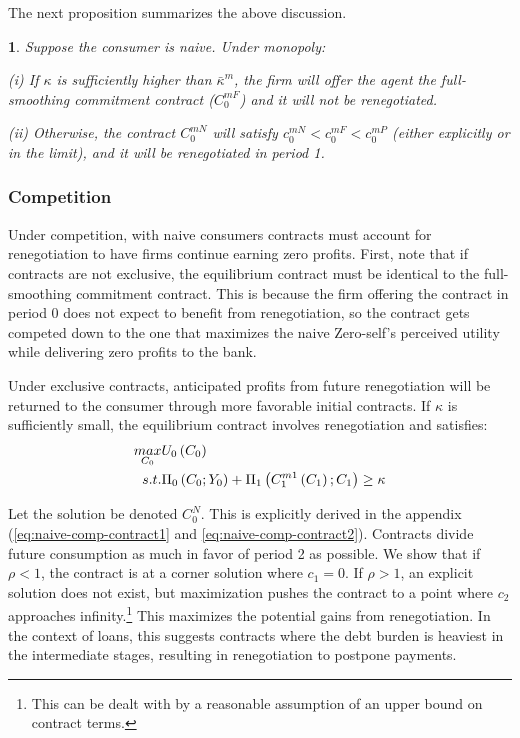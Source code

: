 \documentclass[11pt,english]{article}
\theoremstyle{plain}
\newtheorem{prop}{\protect\propositionname}
\theoremstyle{definition}
\providecommand{\propositionname}{Proposition}
\begin{document}
The next proposition summarizes the above discussion. 
\begin{prop}
Suppose the consumer is naive. Under monopoly:

(i) If $\kappa$ is sufficiently higher than $\bar{\kappa}^{m}$,
the firm will offer the agent the full-smoothing commitment contract
($C_{0}^{mF}$) and it will not be renegotiated. 

(ii) Otherwise, the contract $C_{0}^{mN}$ will satisfy $c_{0}^{mN}<c_{0}^{mF}<c_{0}^{mP}$
(either explicitly or in the limit), and it will be renegotiated in
period 1. 
\end{prop}

\subsubsection{Competition}

Under competition, with naive consumers contracts must account for
renegotiation to have firms continue earning zero profits. First,
note that if contracts are not exclusive, the equilibrium contract
must be identical to the full-smoothing commitment contract. This
is because the firm offering the contract in period 0 does not expect
to benefit from renegotiation, so the contract gets competed down
to the one that maximizes the naive Zero-self's perceived utility
while delivering zero profits to the bank.

Under exclusive contracts, anticipated profits from future renegotiation
will be returned to the consumer through more favorable initial contracts.
If $\kappa$ is sufficiently small, the equilibrium contract involves
renegotiation and satisfies: 
\begin{align}
\underset{C_{0}}{\mbox{\ensuremath{max}}} & U_{0}\left(C_{0}\right)\nonumber \\
s.t. & \Pi_{0}\left(C_{0};Y_{0}\right)+\Pi_{1}\left(C_{1}^{m1}\left(C_{1}\right);C_{1}\right)\geq\kappa
\end{align}

Let the solution be denoted $C_{0}^{N}$. This is explicitly derived
in the appendix (\ref{eq:naive-comp-contract1} and \ref{eq:naive-comp-contract2}).
Contracts divide future consumption as much in favor of period 2 as
possible. We show that if $\rho<1$, the contract is at a corner solution
where $c_{1}=0$. If $\rho>1$, an explicit solution does not exist,
but maximization pushes the contract to a point where $c_{2}$ approaches
infinity.\footnote{This can be dealt with by a reasonable assumption of an upper bound
on contract terms.} This maximizes the potential gains from renegotiation. In the context
of loans, this suggests contracts where the debt burden is heaviest
in the intermediate stages, resulting in renegotiation to postpone
payments.
\end{document}
